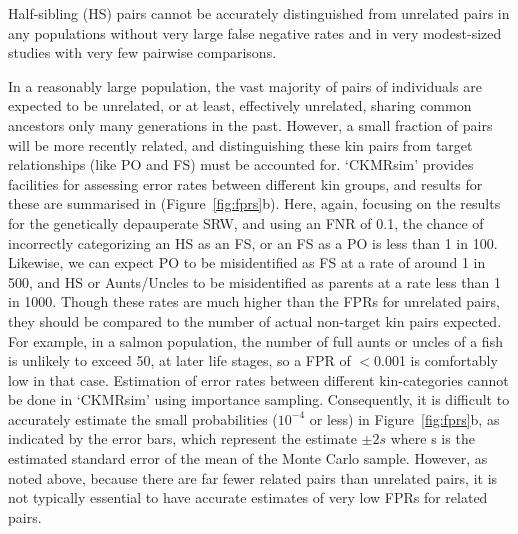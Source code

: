 Half-sibling (HS) pairs cannot be accurately
distinguished from unrelated pairs in any populations without very large false negative rates
and in very modest-sized studies with very few pairwise comparisons.  

In a reasonably large population, the vast majority of pairs of individuals are expected to
be unrelated, or at least, effectively unrelated, sharing common ancestors only many generations
in the past.  However, a small fraction of pairs will be more recently related, and distinguishing these
kin pairs from target relationships (like PO and FS) must be accounted for.  `CKMRsim' provides
facilities for assessing error rates between different kin groups, and results for these are
summarised in (Figure~\ref{fig:fprs}b). Here, again, focusing on the results for the genetically
depauperate SRW, and using an FNR of 0.1, the chance of incorrectly
categorizing an HS as an FS,  or an FS as a PO is less than 1 in 100. Likewise, 
we can expect PO to be misidentified as FS at a rate of around 1 in 500, and 
HS or Aunts/Uncles to be misidentified as parents at a rate less than 1 in 1000.
Though these rates are much higher than the FPRs for unrelated pairs, they should be
compared to the number of actual non-target kin pairs expected.  For example, in a salmon
population, the number of full aunts or uncles of a fish is unlikely to exceed 50, 
at later life stages,  so a FPR of  $<$0.001 is comfortably low in that case.
Estimation of
error rates between different kin-categories cannot be done in `CKMRsim' using
importance sampling. Consequently, it is difficult to accurately estimate the small
probabilities ($10^{-4}$ or less) in Figure~\ref{fig:fprs}b, as indicated by the error bars,
which represent the estimate $\pm2s$ where s is the estimated standard error of the
mean of the Monte Carlo sample.  However, as noted above, because there are
far fewer related pairs than unrelated pairs, it is not typically essential to
have accurate estimates of very low FPRs for related pairs.  


